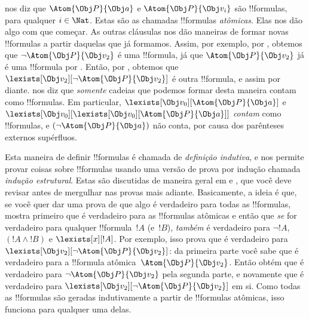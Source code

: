 \documentclass[../../../include/open-logic-section]{subfiles}
\begin{document}
 nos diz que $\Atom{\Obj P}{\Obj a}$ e
$\Atom{\Obj P}{\Obj v_i}$ são !!{formula}s, para qualquer $i \in
\Nat$. Estas são as chamadas !!{formula}s \emph{atômicas}. Elas nos
dão algo com que começar.  As outras cláusulas nos dão maneiras de
formar novas !!{formula}s a partir daquelas que já formamos. Assim, por
exemplo, por , obtemos que $\lnot \Atom{\Obj P}{\Obj
v_2}$ é uma !!{formula}, já que $\Atom{\Obj P}{\Obj v_2}$ já é uma
!!{formula} por . Então, por ,
obtemos que $\lexists[\Obj v_2][\lnot \Atom{\Obj P}{\Obj v_2}]$ é
outra !!{formula}, e assim por diante.   nos diz
que \emph{somente} cadeias que podemos formar desta maneira contam
como !!{formula}s. Em particular, $\lexists[\Obj v_0][\Atom{\Obj
P}{\Obj a}]$ e $\lexists[\Obj v_0][\lexists[\Obj v_0][\Atom{\Obj
P}{\Obj a}]]$ \emph{contam} como !!{formula}s, e $(\lnot \Atom{\Obj
P}{\Obj a})$ não conta, por causa dos parênteses externos
supérfluos.

Esta maneira de definir !!{formula}s é chamada de \emph{definição
indutiva}, e nos permite provar coisas sobre !!{formula}s usando uma
versão de prova por indução chamada \emph{indução estrutural}. Estas
são discutidas de maneira geral em  e
, que você deve revisar antes de mergulhar
nas provas mais adiante. Basicamente, a ideia é que, se você quer dar
uma prova de que algo é verdadeiro para todas as !!{formula}s, mostra
primeiro que é verdadeiro para as !!{formula}s atômicas e então que
\emph{se} for verdadeiro para qualquer !!{formula}~$!A$ (e~$!B$),
\emph{também} é verdadeiro para $\lnot !A$, $(!A \land !B)$ e
$\lexists[x][!A]$. Por exemplo, isso prova que é verdadeiro para
$\lexists[\Obj v_2][\lnot \Atom{\Obj P}{\Obj v_2}]$: da primeira parte
você sabe que é verdadeiro para a !!{formula} atômica~$\Atom{\Obj
P}{\Obj v_2}$. Então obtém que é verdadeiro para $\lnot \Atom{\Obj
P}{\Obj v_2}$ pela segunda parte, e novamente que é verdadeiro para
$\lexists[\Obj v_2][\lnot \Atom{\Obj P}{\Obj v_2}]$ em si. Como todas
as !!{formula}s são geradas indutivamente a partir de !!{formula}s
atômicas, isso funciona para qualquer uma delas.
\end{document}
